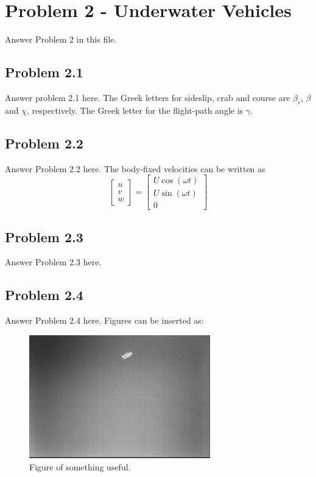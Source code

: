 \section*{Problem 2 - Underwater Vehicles}
Answer Problem 2 in this file. 
\subsection*{Problem 2.1}
Answer problem 2.1 here. The Greek letters for sideslip, crab and course are $\beta_r$, $\beta$ and $\chi$, respectively. The Greek letter for the flight-path angle is $\gamma$.

\subsection*{Problem 2.2}
Answer Problem 2.2 here. The body-fixed velocities can be written as
\begin{equation}
\label{eq:velocity}
	\begin{bmatrix}
		u \\
		v \\
		w
	\end{bmatrix}
	= 
	\begin{bmatrix}
		U \cos( \omega t)\\
		U \sin(\omega t)\\
		0	
	\end{bmatrix}
\end{equation}

\subsection*{Problem 2.3}
Answer Problem 2.3 here.

\subsection*{Problem 2.4}
Answer Problem 2.4 here. Figures can be inserted as:
\begin{figure}[ht]
	\centering
	\includegraphics[width=0.7\textwidth]{assignment_1/rapport/figures/fig1} %
	\caption{Figure of something useful.}
	\label{fig:fig1}
\end{figure}

